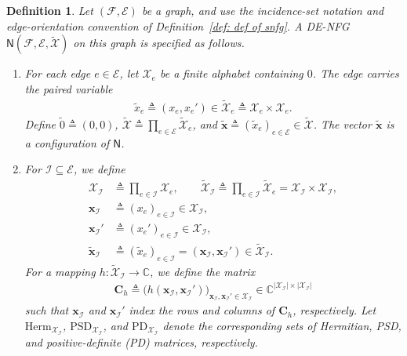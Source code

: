\documentclass[journal]{IEEEtran}
\newcommand{\add}[1]{{\color{black}#1}}
\newtheorem{definition}[theorem]{Definition}
\newcommand{\vect}[1]{ \bm{#1} }
\newcommand{\set}[1]{\mathcal{#1}}
\newcommand{\setEfull}{ \mathcal{E} }
\newcommand{\setF}{ \mathcal{F} }
\newcommand{\sC}{\mathbb{C}}
\newcommand{\vx}{ \vect{x} }
\newcommand{\graphN}{ \mathsf{N} }
\newcommand{\defeq}{ \triangleq }
\newcommand{\setHerm}[1]{ \mathrm{Herm}_{#1} }
\newcommand{\setPSD}[1]{ \mathrm{PSD}_{#1} }
\newcommand{\setPD}[1]{ \mathrm{PD}_{#1} }
\newcommand{\tset}[1]{\tilde{\mathcal{#1}}}
\newcommand{\matr}[1]{\vect{#1}}
\newcommand{\tx}{ \tilde{x} }
\newcommand{\tvx}{ \tilde{\vect{x}}  }
\newcommand{\tzero}{\tilde{0}}
\begin{document}
\begin{definition}\label{sec:DENFG:def:4}
  \add{Let $(\setF,\setEfull)$ be a graph, and use the incidence-set notation
    and edge-orientation convention of Definition~\ref{def: def of snfg}. A
    DE-NFG $\graphN(\setF,\setEfull,\tset{X})$ on this graph is specified as
    follows.}
  \begin{enumerate}

    \item\label{sec:DENFG:def:4:item:1} \add{For each edge $e\in\setEfull$, let
            $\set{X}_e$ be a finite alphabet containing $0$. The edge carries the
            paired variable}
          \begin{align*}
            \tx_e \defeq (x_e,x_e') \in
            \tset{X}_e \defeq \set{X}_e\times\set{X}_e.
          \end{align*}
          \add{Define $\tzero\defeq(0,0)$, $\tset{X}\defeq\prod_{e\in\setEfull}\tset{X}_e$, and $\tvx\defeq(\tx_e)_{e\in\setEfull}\in\tset{X}$. The vector $\tvx$ is a configuration of $\graphN$.}

    \item\label{sec:DENFG:def:4:item:3}
          \add{For $\set{I}\subseteq\setEfull$, we define}
          \begin{align*}
            \set{X}_{\set{I}}
             & \defeq \prod_{e\in\set{I}}\set{X}_e,       \qquad
            \tset{X}_{\set{I}}
            \defeq \prod_{e\in\set{I}}\tset{X}_e
            = \set{X}_{\set{I}}\times\set{X}_{\set{I}},          \\
            \vx_{\set{I}}
             & \defeq (x_e)_{e\in\set{I}}\in\set{X}_{\set{I}},   \\
            \vx_{\set{I}}'
             & \defeq (x_e')_{e\in\set{I}}\in\set{X}_{\set{I}},  \\
            \tvx_{\set{I}}
             & \defeq(\tx_e)_{e\in\set{I}}
            =(\vx_{\set{I}},\vx_{\set{I}}')
            \in\tset{X}_{\set{I}}.
          \end{align*}
          \add{For a mapping $h:\tset{X}_{\set{I}}\to\sC$, we define the matrix}
          \begin{align}
            \matr{C}_{h}
            \defeq
            \bigl(h(\vx_{\set{I}},\vx_{\set{I}}')\bigr)_{
                                                   \vx_{\set{I}},\vx_{\set{I}}'\in\set{X}_{\set{I}}}
            \in\sC^{|\set{X}_{\set{I}}|\times|\set{X}_{\set{I}}|}
            \label{sec:DENFG:eqn:6}
          \end{align}
          \add{such that $\vx_{\set{I}}$ and $\vx_{\set{I}}'$ index the rows
            and columns of $\matr{C}_{h}$, respectively. Let
            $\setHerm{\set{X}_{\set{I}}}$, $\setPSD{\set{X}_{\set{I}}}$, and
            $\setPD{\set{X}_{\set{I}}}$ denote the corresponding sets of
            Hermitian, PSD, and positive-definite (PD) matrices, respectively.}


\end{enumerate}
\end{definition}
\end{document}
